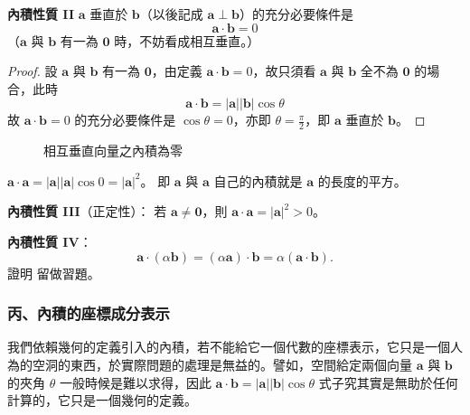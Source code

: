 \textbf{內積性質 II}\quad
$\mathbf{a}$ 垂直於 $\mathbf{b}$（以後記成 $\mathbf{a} \perp \mathbf{b}$）的充分必要條件是
\[ \mathbf{a}\cdot\mathbf{b} = 0 \]
（$\mathbf{a}$ 與 $\mathbf{b}$ 有一為 $\mathbf{0}$ 時，不妨看成相互垂直。）

\begin{proof}
設 $\mathbf{a}$ 與 $\mathbf{b}$ 有一為 $\mathbf{0}$，由定義 $\mathbf{a}\cdot\mathbf{b} = 0$，故只須看 $\mathbf{a}$ 與 $\mathbf{b}$ 全不為 $\mathbf{0}$ 的場合，此時
\[ \mathbf{a}\cdot\mathbf{b} = |\mathbf{a}||\mathbf{b}|\cos\theta \]
故 $\mathbf{a}\cdot\mathbf{b} = 0$ 的充分必要條件是 $\cos\theta = 0$，亦即 $\theta = \frac{\pi}{2}$，即 $\mathbf{a}$ 垂直於 $\mathbf{b}$。\qedhere
\end{proof}

\begin{figure}[H]
\centering
{}
\caption{相互垂直向量之內積為零}
\label{fig:b3s-fig3-37}
\end{figure}

\begin{proposition}
$\mathbf{a}\cdot\mathbf{a} = |\mathbf{a}||\mathbf{a}|\cos 0 = |\mathbf{a}|^2$。
即 $\mathbf{a}$ 與 $\mathbf{a}$ 自己的內積就是 $\mathbf{a}$ 的長度的平方。\qedhere
\end{proposition}

\textbf{內積性質 III}（正定性）：
若 $\mathbf{a} \ne \mathbf{0}$，則 $\mathbf{a}\cdot\mathbf{a} = |\mathbf{a}|^2 > 0$。

\textbf{內積性質 IV}：
\[ \mathbf{a}\cdot(\alpha\mathbf{b}) = (\alpha\mathbf{a})\cdot\mathbf{b} = \alpha(\mathbf{a}\cdot\mathbf{b}). \]
證明 留做習題。

\subsubsection*{丙、內積的座標成分表示}

我們依賴幾何的定義引入的內積，若不能給它一個代數的座標表示，它只是一個人為的空洞的東西，於實際問題的處理是無益的。譬如，空間給定兩個向量 $\mathbf{a}$ 與 $\mathbf{b}$ 的夾角 $\theta$ 一般時候是難以求得，因此 $\mathbf{a}\cdot\mathbf{b} = |\mathbf{a}||\mathbf{b}|\cos\theta$ 式子究其實是無助於任何計算的，它只是一個幾何的定義。

